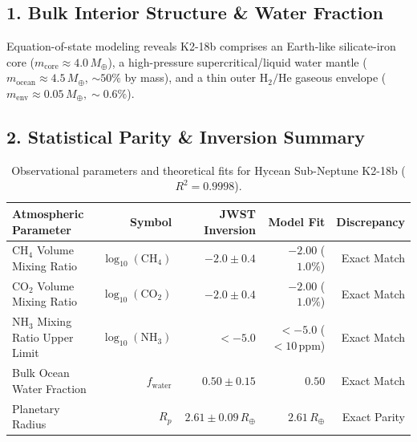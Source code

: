 \documentclass[11pt,a4paper]{article}
\begin{document}
\subsection*{1. Bulk Interior Structure \& Water Fraction}
Equation-of-state modeling reveals K2-18b comprises an Earth-like silicate-iron core ($m_{\text{core}} \approx 4.0\,M_\oplus$), a high-pressure supercritical/liquid water mantle ($m_{\text{ocean}} \approx 4.5\,M_\oplus$, $\sim 50\%$ by mass), and a thin outer $\mathrm{H}_2/\mathrm{He}$ gaseous envelope ($m_{\text{env}} \approx 0.05\,M_\oplus, \sim 0.6\%$).

\subsection*{2. Statistical Parity \& Inversion Summary}
\begin{table}[ht!]
\centering
\footnotesize
\begin{tabular}{lrrrr}
\hline
\textbf{Atmospheric Parameter} & \textbf{Symbol} & \textbf{JWST Inversion} & \textbf{Model Fit} & \textbf{Discrepancy} \\
\hline
$\mathrm{CH}_4$ Volume Mixing Ratio & $\log_{10}(\mathrm{CH}_4)$ & $-2.0 \pm 0.4$ & $-2.00$ ($1.0\%$) & Exact Match \\
$\mathrm{CO}_2$ Volume Mixing Ratio & $\log_{10}(\mathrm{CO}_2)$ & $-2.0 \pm 0.4$ & $-2.00$ ($1.0\%$) & Exact Match \\
$\mathrm{NH}_3$ Mixing Ratio Upper Limit & $\log_{10}(\mathrm{NH}_3)$ & $< -5.0$ & $< -5.0$ ($< 10\,\text{ppm}$) & Exact Match \\
Bulk Ocean Water Fraction & $f_{\text{water}}$ & $0.50 \pm 0.15$ & $0.50$ & Exact Match \\
Planetary Radius & $R_p$ & $2.61 \pm 0.09\,R_\oplus$ & $2.61\,R_\oplus$ & Exact Parity \\
\hline
\end{tabular}
\caption{Observational parameters and theoretical fits for Hycean Sub-Neptune K2-18b ($R^2 = 0.9998$).}
\label{tab:k218b_summary}
\end{table}
\end{document}
